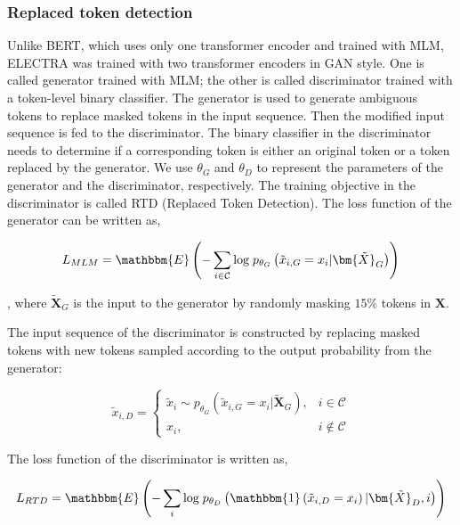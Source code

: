 \subsubsection{Replaced token detection} Unlike BERT, which uses only one transformer encoder and trained with MLM, ELECTRA was trained with two transformer encoders in GAN style. One is called generator trained with MLM; the other is called discriminator trained with a token-level binary classifier. The generator is used to generate ambiguous tokens to replace masked tokens in the input sequence. Then the modified input sequence is fed to the discriminator. The binary classifier in the discriminator needs to determine if a corresponding token is either an original token or a token replaced by the generator. We use $\theta _ G$ and $\theta _ D$ to represent the parameters of the generator and the discriminator, respectively. The training objective in the discriminator is called RTD (Replaced Token Detection). The loss function of the generator can be written as,

\begin{equation}
\label{eq:lg}

    L_{MLM} =  \mathbbm{E}\left( -\sum_{i\in \mathcal{C}}{\text{log} \;  p_{\theta_G}\left(\tilde{x}_{i,G}=x_i|\bm{\tilde{X}}_G\right)} \right)

\end{equation}

, where $\bm{\tilde{X}}_G$ is the input to the generator by randomly masking $15\%$ tokens in $\bm{X}$. 

The input sequence of the discriminator is constructed by replacing masked tokens with new tokens sampled according to the output probability from the generator:

\begin{equation}
\label{eq:xd}
\tilde{x}_{i,D} = \left\{ \begin{array}{cr}
    \tilde{x}_{i} \sim  p_{\theta_G}\left(\tilde{x}_{i,G}=x_i|\bm{\tilde{X}}_G\right),  & i \in \mathcal{C}  \\
      x_{i}, & i \notin \mathcal{C}
\end{array}\right.
\end{equation}

The loss function of the discriminator is written as,

\begin{equation}
\label{eq:ld}

  L_{RTD} =    \mathbbm{E}\left(- \sum_{i}{\text{log} \;  p_{\theta_D}\left(\mathbbm{1}\left(\tilde{x}_{i,D}=x_i\right)|\bm{\tilde{X}}_{D}, i \right)}\right) 

\end{equation}

